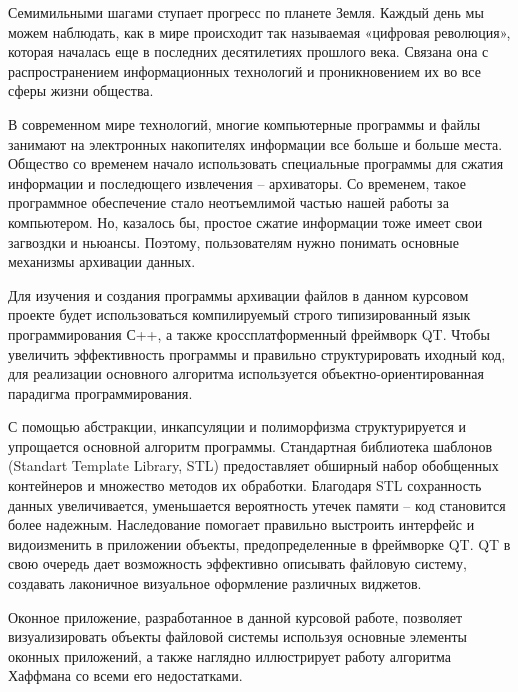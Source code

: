 \label{sec:intro}

Семимильными шагами ступает прогресс по планете Земля. Каждый день мы можем наблюдать,
как в мире происходит так называемая «цифровая революция», которая
началась еще в последних десятилетиях прошлого века. Связана она с распространением
информационных технологий и проникновением их во все сферы жизни общества.



В современном мире технологий, многие компьютерные программы и файлы занимают на электронных накопителях информации все больше и больше места. 
Общество со временем начало использовать специальные программы для сжатия информации и последющего извлечения -- архиваторы. 
Со временем, такое программное обеспечение стало неотъемлимой частью нашей работы за компьютером. 
Но, казалось бы, простое сжатие информации тоже имеет свои загвоздки и ньюансы.
Поэтому, пользователям нужно понимать основные механизмы архивации данных.



Для изучения и создания программы архивации файлов в данном курсовом проекте будет использоваться компилируемый строго типизированный язык программирования С++, а также кроссплатформенный фреймворк QT.
Чтобы увеличить эффективность программы и правильно структурировать иходный код, для реализации основного алгоритма используется объектно-ориентированная парадигма программирования.



С помощью абстракции, инкапсуляции и полиморфизма\cite{lafore} структурируется и упрощается основной алгоритм программы. 
Стандартная библиотека шаблонов\cite{lucik} (Standart Template Library, STL) предоставляет обширный набор обобщенных контейнеров и множество методов их обработки. 
Благодаря STL сохранность данных увеличивается, уменьшается вероятность утечек памяти -- код становится более надежным.
Наследование помогает правильно выстроить интерфейс и видоизменить в приложении объекты, предопределенные в фреймворке QT\cite{qt_doc}. 
QT в свою очередь дает возможность эффективно описывать файловую систему\cite{filemodel}, создавать лаконичное визуальное оформление различных виджетов.



Оконное приложение, разработанное в данной курсовой работе, позволяет визуализировать объекты файловой системы используя основные элементы оконных приложений, а также наглядно иллюстрирует работу алгоритма Хаффмана со всеми его недостатками. 